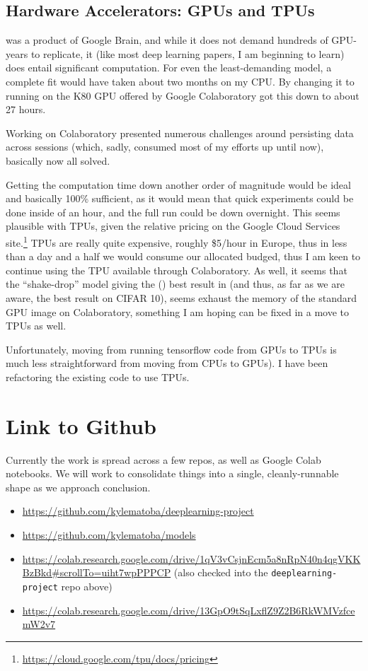 \documentclass[10pt,twocolumn,letterpaper]{article}
\begin{document}
\subsection{Hardware Accelerators: GPUs and TPUs}
\cite{Cubuk2018} was a product of Google Brain, and while it does not demand hundreds of GPU-years to replicate, it (like most deep learning papers, I am beginning to learn) does entail significant computation. For even the least-demanding model, a complete fit would have taken about two months on my CPU. By changing it to running on the K80 GPU offered by Google Colaboratory got this down to about 27 hours. 

Working on Colaboratory presented numerous challenges around persisting data across sessions (which, sadly, consumed most of my efforts up until now), basically now all solved. 

Getting the computation time down another order of magnitude would be ideal and basically 100\% sufficient, as it would mean that quick experiments could be done inside of an hour, and the full run could be down overnight. This seems plausible with TPUs, given the relative pricing on the Google Cloud Services site.\footnote{\url{https://cloud.google.com/tpu/docs/pricing}} TPUs are really quite expensive, roughly \$5/hour in Europe, thus in less than a day and a half we would consume our allocated budged, thus I am keen to continue using the TPU available through Colaboratory. As well, it seems that the ``shake-drop'' model giving the (\cite{Yamada2018}) best result in \cite{Cubuk2018} (and thus, as far as we are aware, the best result on CIFAR 10), seems exhaust the memory of the standard GPU image on Colaboratory, something I am hoping can be fixed in a move to TPUs as well. 

Unfortunately, moving from running tensorflow code from GPUs to TPUs is much less straightforward from moving from CPUs to GPUs). I have been refactoring the existing code to use TPUs. 


\section{Link to Github}
Currently the work is spread across a few repos, as well as Google Colab notebooks. We will work to consolidate things into a single, cleanly-runnable shape as we approach conclusion.

\begin{itemize}
\item \url{https://github.com/kylematoba/deeplearning-project}
\item \url{https://github.com/kylematoba/models}
\item \url{https://colab.research.google.com/drive/1qV3vCsjnEcm5a8nRpN40n4qgVKKBzBkd#scrollTo=uiht7wpPPPCP} (also checked into the \texttt{deeplearning-project} repo above)
\item \url{https://colab.research.google.com/drive/13GpO9tSqLxflZ9Z2B6RkWMVzfcemW2v7}
\end{itemize}


\nocite{Torralba2008}
{\small


}
\end{document}
